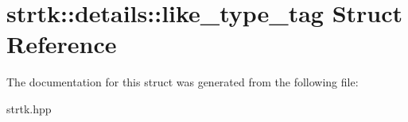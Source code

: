 \hypertarget{structstrtk_1_1details_1_1like__type__tag}{\section{strtk\-:\-:details\-:\-:like\-\_\-type\-\_\-tag Struct Reference}
\label{structstrtk_1_1details_1_1like__type__tag}
}


The documentation for this struct was generated from the following file\-:\begin{DoxyCompactItemize}
\item 
strtk.\-hpp\end{DoxyCompactItemize}
